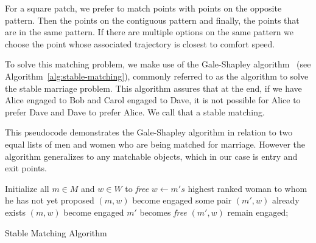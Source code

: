 For a square patch, we prefer to match points with points on the opposite pattern. Then the points on the contiguous pattern and finally, the points that are in the same pattern. If there are multiple options on the same pattern we choose the point whose associated trajectory is closest to comfort speed.

To solve this matching problem, we make use of the Gale-Shapley algorithm~\cite{gale1962college} (see Algorithm~\ref{alg:stable-matching}), commonly referred to as the algorithm to solve the stable marriage problem.  This algorithm assures that at the end, if we have Alice engaged to Bob and Carol engaged to Dave, it is not possible for Alice to prefer Dave and Dave to prefer Alice. We call that a stable matching.  

This pseudocode demonstrates the Gale-Shapley algorithm in relation to two equal lists of men and women who are being matched for marriage. However the algorithm generalizes to any matchable objects, which in our case is entry and exit points.

\begin{algorithm}[t]

Initialize all $m \in M$ and $w \in W$ to \textit{free} \;
 {
	$w \leftarrow m's$ highest ranked woman to whom he has not yet proposed \;
	{ 
		$(m,w)$ become engaged \;
	}
	{
		some pair $(m',w)$ already exists \;
		{
			$(m,w)$ become engaged \;
			$m'$ becomes \textit{free} \;
		}
		{
			 $(m',w)$ remain engaged;
		}
	}
}
\caption{Stable Matching Algorithm}
\label{alg:stable-matching}
\end{algorithm}


